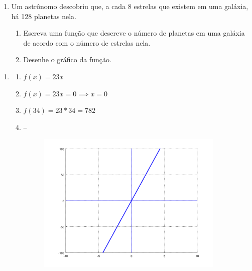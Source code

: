 \documentclass[11pt]{article}
\begin{document}
\begin{enumerate}
	\item Um astrônomo descobriu que, a cada 8 estrelas que existem em uma
		galáxia, há 128 planetas nela.
	\begin{enumerate}
		\item Escreva uma função que descreve o número de planetas em uma 
			galáxia de acordo com o número de estrelas nela.
		\item Desenhe o gráfico da função.
	\end{enumerate}
\end{enumerate}

\newpage

\begin{enumerate}
	\item 
	\begin{enumerate}
		\item $f(x) = 23x$
		\item $f(x) = 23x = 0 \implies x = 0$
		\item $f(34) = 23*34 = 782$
		\item -- 
			\begin{figure}[H]
				\centering
				\includegraphics[width=0.9\textwidth]{imgs/ex1c.png}
			\end{figure}
	\end{enumerate}


\end{enumerate}
\end{document}
